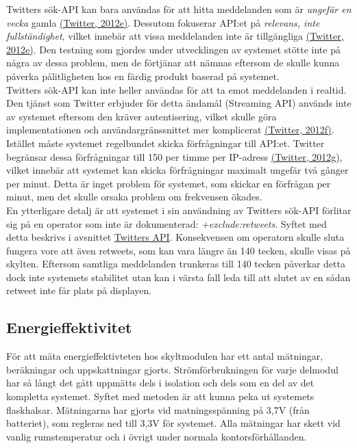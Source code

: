 \documentclass[a4paper,11pt]{article}
\begin{document}
Twitters sök-API kan bara användas för att hitta meddelanden som är {\it ungefär en vecka} gamla \hyperref[twitter]{(Twitter, 2012e)}. Dessutom fokuserar API:et på {\it relevans, inte fullständighet}, vilket innebär att vissa meddelanden inte är tillgängliga \hyperref[twitter]{(Twitter, 2012e)}. Den testning som gjordes under utvecklingen av systemet stötte inte på några av dessa problem, men de förtjänar att nämnas eftersom de skulle kunna påverka pålitligheten hos en färdig produkt baserad på systemet.\\

Twitters sök-API kan inte heller användas för att ta emot meddelanden i realtid. Den tjänst som Twitter erbjuder för detta ändamål (Streaming API) används inte av systemet eftersom den kräver autentisering, vilket skulle göra implementationen och användargränssnittet mer komplicerat \hyperref[twitter]{(Twitter, 2012f)}. Istället måste systemet regelbundet skicka förfrågningar till API:et. Twitter begränsar dessa förfrågningar till 150 per timme per IP-adress \hyperref[twitter]{(Twitter, 2012g)}, vilket innebär att systemet kan skicka förfrågningar maximalt ungefär två gånger per minut. Detta är inget problem för systemet, som skickar en förfrågan per minut, men det skulle orsaka problem om frekvensen ökades.\\

En ytterligare detalj är att systemet i sin användning av Twitters sök-API förlitar sig på en operator som inte är dokumenterad: {\it +exclude:retweets}. Syftet med detta beskrivs i avsnittet \hyperref[twitterapi]{Twitters API}. Konsekvensen om operatorn skulle sluta fungera vore att även retweets, som kan vara längre än 140 tecken, skulle visas på skylten. Eftersom samtliga meddelanden trunkeras till 140 tecken påverkar detta dock inte systemets stabilitet utan kan i värsta fall leda till att slutet av en sådan retweet inte får plats på displayen.\\

\subsection{Energieffektivitet}
För att mäta energieffektivteten hos skyltmodulen har ett antal mätningar, beräkningar och uppskattningar gjorts. Strömförbrukningen för varje delmodul har så långt det gått uppmätts dels i isolation och dels som en del av det kompletta systemet. Syftet med metoden är att kunna peka ut systemets flaskhalsar. Mätningarna har gjorts vid matningsspänning på 3,7V (från batteriet), som regleras ned till 3,3V för systemet. Alla mätningar har skett vid vanlig rumstemperatur och i övrigt under normala kontorsförhållanden.\\
\end{document}
